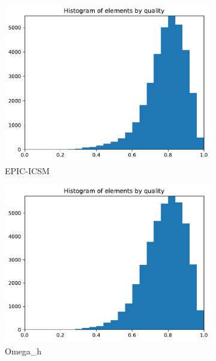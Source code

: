 \documentclass[3p,times,procedia,number]{elsarticle}
\begin{document}
\begin{figure}
\begin{subfigure}{.16\textwidth}
\includegraphics[width=\textwidth]{epic-icsm-cube-cylinder-linear-quality.pdf}
\caption{EPIC-ICSM}
\end{subfigure}
\begin{subfigure}{.16\textwidth}
\centering
\includegraphics[width=\textwidth]{omega_h-cube-cylinder-linear-quality.pdf}
\caption{Omega\_h}
\end{subfigure}
\begin{subfigure}{.16\textwidth}
\centering

\end{subfigure}
\end{figure}
\end{document}
